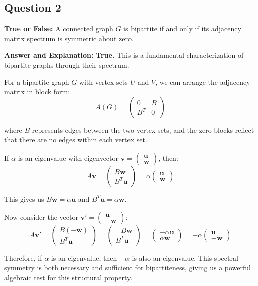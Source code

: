 \documentclass[11pt]{article}
\newenvironment{answer}{\color{answercolor}\begin{framed}\textbf{Answer and Explanation:}}{\end{framed}}
\begin{document}
\subsection{Question 2}
\textbf{True or False:} A connected graph $G$ is bipartite if and only if its adjacency matrix spectrum is symmetric about zero.

\begin{answer}
\textbf{True.} This is a fundamental characterization of bipartite graphs through their spectrum.

For a bipartite graph $G$ with vertex sets $U$ and $V$, we can arrange the adjacency matrix in block form:
$$A(G) = \begin{pmatrix} 0 & B \\ B^T & 0 \end{pmatrix}$$

where $B$ represents edges between the two vertex sets, and the zero blocks reflect that there are no edges within each vertex set.

If $\alpha$ is an eigenvalue with eigenvector $\mathbf{v} = \begin{pmatrix} \mathbf{u} \\ \mathbf{w} \end{pmatrix}$, then:
$$A\mathbf{v} = \begin{pmatrix} B\mathbf{w} \\ B^T\mathbf{u} \end{pmatrix} = \alpha \begin{pmatrix} \mathbf{u} \\ \mathbf{w} \end{pmatrix}$$

This gives us $B\mathbf{w} = \alpha\mathbf{u}$ and $B^T\mathbf{u} = \alpha\mathbf{w}$.

Now consider the vector $\mathbf{v'} = \begin{pmatrix} \mathbf{u} \\ -\mathbf{w} \end{pmatrix}$:
$$A\mathbf{v'} = \begin{pmatrix} B(-\mathbf{w}) \\ B^T\mathbf{u} \end{pmatrix} = \begin{pmatrix} -B\mathbf{w} \\ B^T\mathbf{u} \end{pmatrix} = \begin{pmatrix} -\alpha\mathbf{u} \\ \alpha\mathbf{w} \end{pmatrix} = -\alpha \begin{pmatrix} \mathbf{u} \\ -\mathbf{w} \end{pmatrix}$$

Therefore, if $\alpha$ is an eigenvalue, then $-\alpha$ is also an eigenvalue. This spectral symmetry is both necessary and sufficient for bipartiteness, giving us a powerful algebraic test for this structural property.
\end{answer}
\end{document}
